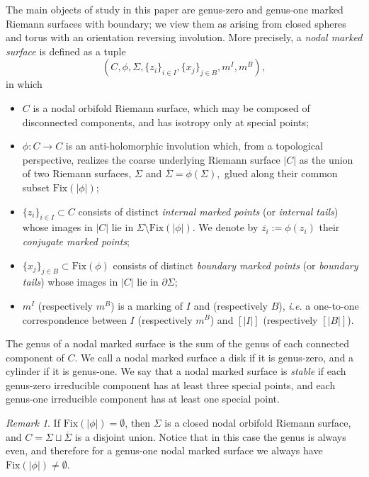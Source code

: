 \documentclass[11pt]{amsart}
\theoremstyle{definition}
\theoremstyle{remark}
\newtheorem{rmk}[dummy]{Remark}
\newcommand{\<}{\left<}
\renewcommand{\>}{\right>}
\numberwithin{equation}{section}
\begin{document}
The main objects of study in this paper are genus-zero and genus-one marked Riemann surfaces with boundary; we view them as arising from closed spheres and torus with an orientation reversing involution.  More precisely, a \textit{nodal marked surface} is defined as a tuple
$$(C, \phi, \Sigma, \{z_i\}_{i \in I}, \{x_j\}_{j \in B}, m^I, m^B),$$
in which
\begin{itemize}
\item  $C$ is a nodal orbifold Riemann surface, which may be composed of disconnected components, and has isotropy only at special points;
\item $\phi: C \to C$ is an anti-holomorphic involution which, from a topological perspective, realizes the coarse underlying Riemann surface $|C|$  as the union of two Riemann surfaces, $\Sigma$ and $\overline{\Sigma}=\phi(\Sigma),$ glued along their common subset $\text{Fix}(|\phi|)$;
\item $\{z_i\}_{i \in I}\subset  C$ consists of distinct \textit{internal marked points} (or \textit{internal tails}) whose images in $|C|$ lie in $\Sigma\setminus\text{Fix}(|\phi|)$. We denote by $\overline{z_i}:= \phi(z_i)$ their \textit{conjugate marked points};
\item $\{x_j\}_{j \in B} \subset \text{Fix}(\phi)$ consists of distinct \textit{boundary marked points} (or \textit{boundary tails}) whose images in $|C|$ lie in ${\partial} \Sigma$;
\item $m^I$ (respectively $m^B$) is a marking of $I$ and (respectively $B$), \textit{i.e.} a one-to-one correspondence between  $I$ (respectively $m^B$) and $\left[\lvert I \rvert\right]$ (respectively $[\lvert B \rvert]$).
\end{itemize}
The genus of a nodal marked surface is the sum of the genus of each connected component of $C$. We call a nodal marked surface a disk if it is genus-zero, and a cylinder if it is genus-one.
We say that a nodal marked surface is \textit{stable} if each genus-zero irreducible component has at least three special points, and each genus-one irreducible component has at least one special point.

\begin{rmk}
    If $\text{Fix}(|\phi|)=\emptyset$, then $\Sigma$ is a closed nodal orbifold Riemann surface, and $C=\Sigma \sqcup \overline{\Sigma}$ is a disjoint union. Notice that in this case the genus is always even, and therefore for a genus-one nodal marked surface we always have $\text{Fix}(|\phi|)\ne \emptyset$.
\end{rmk}
\end{document}
